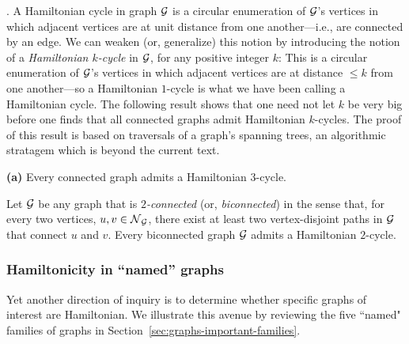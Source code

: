 \medskip


.
A Hamiltonian cycle in graph $\mbox{$\cal G$}$ is a circular enumeration of $\mbox{$\cal G$}$'s vertices in which adjacent vertices are at unit distance from one another---i.e., are connected by an edge.  We can weaken (or, generalize) this notion by introducing the notion of a {\it Hamiltonian $k$-cycle} in $\mbox{$\cal G$}$, for any positive integer $k$:  This is a circular enumeration of $\mbox{$\cal G$}$'s vertices in which adjacent vertices are at distance $\leq k$ from one another---so a Hamiltonian $1$-cycle is what we have been calling a Hamiltonian cycle.  The following result shows that one need not let $k$ be very big before one finds that all connected graphs admit Hamiltonian $k$-cycles.  The proof of this result is based on traversals of a graph's spanning trees, an algorithmic stratagem which is beyond the current text.

\begin{prop}
\label{thm:weak-Hamiltonicity}
{\bf (a)} {\rm \cite{ChartrandK69}}
Every connected graph admits a Hamiltonian $3$-cycle.

\smallskip

 

 {\rm  \cite{Fleischner74}}
Let $\mbox{$\cal G$}$ be any graph that is {\em $2$-connected} (or, {\it biconnected}) in the sense  that, for every two vertices, $u, v \in \mbox{$\cal N$}_{\mbox{{\scriptsize $\cal G$}}}$, there exist at least two vertex-disjoint paths in $\mbox{$\cal G$}$ that connect $u$ and $v$.  Every biconnected graph $\mbox{$\cal G$}$ admits a Hamiltonian $2$-cycle.
\end{prop}

\subsubsection{Hamiltonicity in ``named'' graphs}
\label{sec:hamiltonian-named-graphs}

Yet another direction of inquiry is to determine whether specific graphs of interest are Hamiltonian.  We illustrate this avenue by reviewing the five ``named" families of graphs in
Section~\ref{sec:graphs-important-families}.

